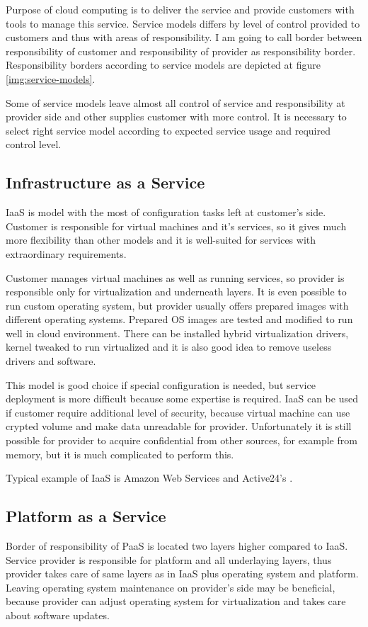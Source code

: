 
Purpose of cloud computing is to deliver the service and provide customers with tools to manage this service. Service models differs by level of control provided to customers and thus with areas of responsibility. I am going to call border between responsibility of customer and responsibility of provider as responsibility border. Responsibility borders according to service models are depicted at figure \ref{img:service-models}.

Some of service models leave almost all control of service and responsibility at provider side and other supplies customer with more control. It is necessary to select right service model according to expected service usage and required control level.

\subsection{Infrastructure as a Service}
\Ac{IaaS} is model with the most of configuration tasks left at customer's side. Customer is responsible for virtual machines and it's services, so it gives much more flexibility than other models and it is well-suited for services with extraordinary requirements. 

Customer manages virtual machines as well as running services, so provider is responsible only for virtualization and underneath layers. It is even possible to run custom operating system, but provider usually offers prepared images with different operating systems. Prepared \Ac{OS} images are tested and modified to run well in cloud environment. There can be installed hybrid virtualization drivers, kernel tweaked to run virtualized and it is also good idea to remove useless drivers and software. 

This model is good choice if special configuration is needed, but service deployment is more difficult because some expertise is required. \Ac{IaaS} can be used if customer require additional level of security, because virtual machine can use crypted volume and make data unreadable for provider. Unfortunately it is still possible for provider to acquire confidential from other sources, for example from memory, but it is much complicated to perform this.

Typical example of \Ac{IaaS} is Amazon Web Services and Active24's .

\subsection{Platform as a Service}
Border of responsibility of \Ac{PaaS} is located two layers higher compared to \Ac{IaaS}. Service provider is responsible for platform and all underlaying layers, thus provider takes care of same layers as in \Ac{IaaS} plus operating system and platform. 
Leaving operating system maintenance on provider's side may be beneficial, because provider can adjust operating system for virtualization and takes care about software updates. 

